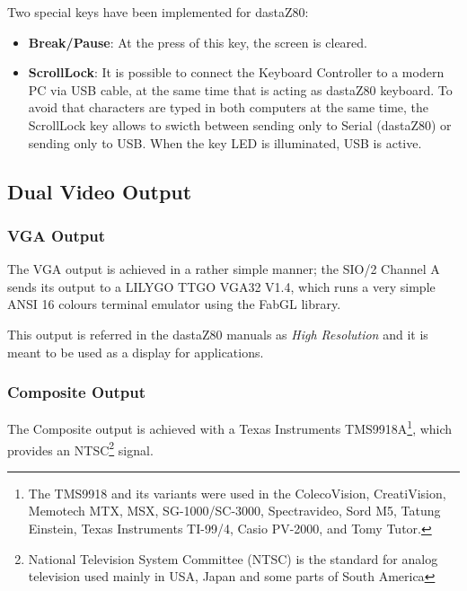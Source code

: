 \documentclass[a4paper,11pt]{article}
\begin{document}
    Two special keys have been implemented for dastaZ80:

    \begin{itemize}
        \item \textbf{Break/Pause}: At the press of this key, the screen is
        cleared.
        \item \textbf{ScrollLock}: It is possible to connect the Keyboard
        Controller to a modern PC via USB cable, at the same time that is acting
        as dastaZ80 keyboard. To avoid that characters are typed in both
        computers at the same time, the ScrollLock key allows to swicth between
        sending only to Serial (dastaZ80) or sending only to USB. When the key
        LED is illuminated, USB is active.
    \end{itemize}

    \subsection{Dual Video Output}

    \subsubsection{VGA Output}

    The VGA output is achieved in a rather simple manner; the SIO/2 Channel A
    sends its output to a LILYGO TTGO VGA32 V1.4, which runs a very simple ANSI
    16 colours terminal emulator using the FabGL library.

    This output is referred in the dastaZ80 manuals as \textit{High Resolution}
    and it is meant to be used as a display for applications.

    \subsubsection{Composite Output}

    The Composite output is achieved with a Texas Instruments TMS9918A\footnote
    {The TMS9918 and its variants were used in the ColecoVision,
    CreatiVision, Memotech MTX, MSX, SG-1000/SC-3000, Spectravideo, Sord M5,
    Tatung Einstein, Texas Instruments TI-99/4, Casio PV-2000, and Tomy Tutor.},
    which provides an NTSC\footnote{National Television System Committee (NTSC)
    is the standard for analog television used mainly in USA, Japan and some
    parts of South America} signal.
\end{document}

